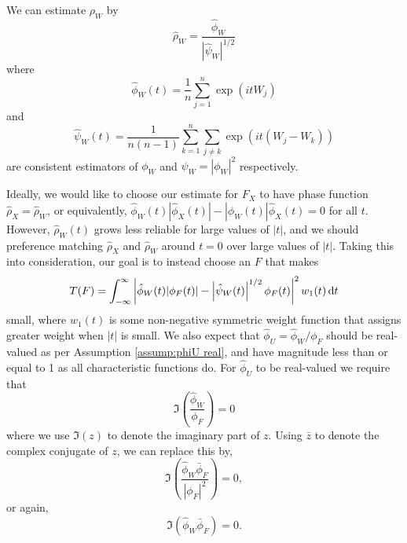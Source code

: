 	We can estimate $\rho_W$ by
	\begin{equation}
		\hat{\rho}_W = \frac{\hat{\phi}_W}{\left|\hat{\psi}_W\right|^{1/2}}
	\end{equation}
	where
	\begin{equation}
	\label{eq:define hat phi W}
		\hat{\phi}_W(t) = \frac{1}{n}\sum_{j = 1}^n \exp(it W_j)
	\end{equation}
	and 
	\begin{equation}
	\label{eq:define hat psi W}
		\hat{\psi}_W(t) = \frac{1}{n(n-1)} \sum_{k=1}^n \sum_{j \neq k} \exp(it (W_j - W_k))
	\end{equation}
	are consistent estimators of $\phi_W$ and $\psi_W = |\phi_W|^2$ respectively.

	Ideally, we would like to choose our estimate for $F_X$ to have phase function $\hat{\rho}_X = \hat{\rho}_W$, or equivalently, $\hat{\phi}_W(t) |\hat{\phi}_X(t)| - |\hat{\phi}_W(t)| \hat{\phi}_X(t) = 0$ for all $t$. 
	However, $\hat{\rho}_W(t)$ grows less reliable for large values of $|t|$, and we should preference matching $\hat{\rho}_X$ and $\hat{\rho}_W$ around $t = 0$ over large values of $|t|$. Taking this into consideration, our goal is to instead choose an $F$ that makes
	\begin{equation}
		T(F) = \int_{-\infty}^\infty \left| \hat{\phi}_W(t) |\phi_F(t)| - \left|\hat{\psi}_W(t)\right|^{1/2} \phi_F(t) \right|^2 w_1(t) \, \mathrm{d} t
	\end{equation}
	small,
	where $w_1(t)$ is some non-negative symmetric weight function that assigns greater weight when $|t|$ is small. We also expect that $\hat{\phi}_U = \hat{\phi}_W / \phi_F$ should be real-valued as per Assumption \ref{assump:phiU real}, and have magnitude less than or equal to 1 as all characteristic functions do. For $\hat{\phi}_U$ to be real-valued we require that
	\begin{equation}
		\Im \left( \frac{\hat{\phi}_W}{\phi_F} \right) = 0
	\end{equation}
	where we use $\Im(z)$ to denote the imaginary part of $z$. Using $\bar{z}$ to denote the complex conjugate of $z$, we can replace this by,
	\begin{equation}
		\Im \left(\frac{\hat{\phi}_W \bar{\phi}_F}{|\phi_F|^2} \right) = 0,
	\end{equation}
	or again,
	\begin{equation}
		\Im \left(\hat{\phi}_W \bar{\phi}_F\right) = 0.
	\end{equation}
